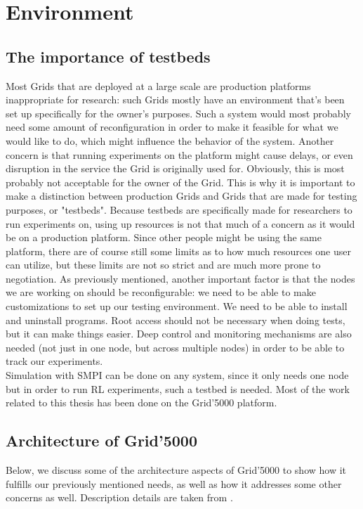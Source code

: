 \section{Environment}
\subsection{The importance of testbeds}
Most Grids that are deployed at a large scale are production platforms
inappropriate for research: such Grids mostly have an environment
that's been
set up specifically for the owner's purposes. Such a system would most
probably need some amount of reconfiguration in order to make it
feasible for what we would like to do, which might influence the
behavior of the system. Another concern is that running experiments on
the platform might cause delays, or even disruption in the
service the Grid is originally used for. Obviously, this is most
probably not acceptable for the owner of the Grid. This is why it is
important to make a distinction between production Grids and Grids
that are made for testing purposes, or "testbeds". Because testbeds
are specifically made for researchers to run experiments on, using up
resources is not that much of a concern as it would be on a production
platform. Since other people might be using the same platform, there
are of course still some limits as to how much resources one user can
utilize, but these limits are not so strict and are much more prone to
negotiation. As previously mentioned, another important factor is that
the nodes we are working on should be reconfigurable: we need to be
able to make customizations to set
up our testing environment. We need to be able to install and
uninstall programs. Root access should not be necessary when doing
tests, but it can make things easier. Deep control and monitoring
mechanisms are also needed (not just in one node, but across multiple
nodes) in order to be able to track our experiments.\\
Simulation with SMPI can be done on any system, since it only needs
one node but in order to run RL experiments, such a testbed is
needed. Most of the work related to this thesis has been done on the
Grid'5000 platform.\cite{bccddjjllmmnpqrtt06}
\subsection{Architecture of Grid'5000}
Below, we discuss some of the architecture aspects of Grid'5000 to
show how it fulfills our previously mentioned needs, as well as how it
addresses some other concerns as well. Description details are taken
from \cite{bccddjjllmmnpqrtt06}.
